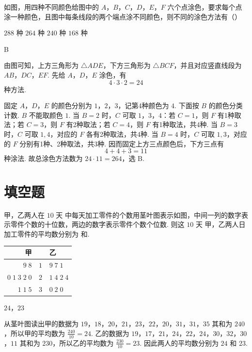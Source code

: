 \begin{problem}
如图，用四种不同颜色给图中的 \(A\)，\(B\)，\(C\)，\(D\)，\(E\)，\(F\) 六个点涂色，要求每个点涂一种颜色，且图中每条线段的两个端点涂不同颜色，则不同的涂色方法有（\quad）


\choices
    {\(288\) 种}
    {\(264\) 种}
    {\(240\) 种}
    {\(168\) 种}
\begin{answer}
B
\end{answer}
\begin{solution}
由图可知，上方三角形为 \(\triangle ADE\)，下方三角形为 \(\triangle BCF\)，并且对应竖直线段为 \(AB\)，\(DC\)，\(EF\). 先给 \(A\)，\(D\)，\(E\) 涂色，有
\[
4\cdot3\cdot2=24
\]
种方法.

固定 \(A\)，\(D\)，\(E\) 的颜色分别为 \(1\)，\(2\)，\(3\)，记第4种颜色为 \(4\). 下面按 \(B\) 的颜色分类计数. \(B\) 不能取颜色 \(1\). 当 \(B=2\) 时，\(C\) 可取 \(1\)，\(3\)，\(4\)：若 \(C=1\)，则 \(F\) 有1种取法；若 \(C=3\)，则 \(F\) 有2种取法；若 \(C=4\)，则 \(F\) 有1种取法，共4种. 当 \(B=3\) 时，\(C\) 可取 \(1,4\)，对应的 \(F\) 各有2种取法，共4种. 当 \(B=4\) 时，\(C\) 可取 \(1,3\)，对应的 \(F\) 分别有1种、2种取法，共3种. 因而固定上方三点颜色后，下方三点有
\[
4+4+3=11
\]
种涂法. 故总涂色方法数为 \(24\cdot11=264\)，选 B.
\end{solution}
\end{problem}

\section{填空题}

\begin{problem}
甲，乙两人在 \(10\text{ 天}\) 中每天加工零件的个数用茎叶图表示如图，中间一列的数字表示零件个数的十位数，两边的数字表示零件个数个位数. 则这 \(10\text{ 天}\) 甲，乙两人日加工零件的平均数分别为\fillinblank{} 和\fillinblank{}.

\begin{center}
\begin{tabular}{@{}r@{\ \ }|c@{\ \ }l@{}}
甲 & \  & 乙 \\
\hline
\(9\;8\) & \(1\) & \(9\;7\;1\) \\
\(0\;1\;3\;2\;0\) & \(2\) & \(1\;4\;2\;4\) \\
\(1\;1\;5\) & \(3\) & \(0\;2\;0\)
\end{tabular}
\end{center}
\begin{answer}
\(24\)，\(23\)
\end{answer}
\begin{solution}
从茎叶图读出甲的数据为
\(19\)，\(18\)，\(20\)，\(21\)，\(23\)，\(22\)，\(20\)，\(31\)，\(31\)，\(35\)
其和为 \(240\)，所以甲的平均数为 \(\frac{240}{10}=24\). 乙的数据为
\(19\)，\(17\)，\(21\)，\(24\)，\(22\)，\(24\)，\(30\)，\(32\)，\(30\)，\(11\)
其和为 \(230\)，所以乙的平均数为 \(\frac{230}{10}=23\). 因此两人的平均数分别为 \(24\) 和 \(23\).
\end{solution}
\end{problem}

